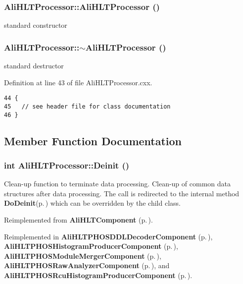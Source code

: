 \subsubsection{\setlength{\rightskip}{0pt plus 5cm}Ali\-HLTProcessor::Ali\-HLTProcessor ()}\label{classAliHLTProcessor_a0}


standard constructor 
\subsubsection{\setlength{\rightskip}{0pt plus 5cm}Ali\-HLTProcessor::$\sim${\bf Ali\-HLTProcessor} ()\hspace{0.3cm}{\tt  [virtual]}}\label{classAliHLTProcessor_a1}


standard destructor 

Definition at line 43 of file Ali\-HLTProcessor.cxx.

\footnotesize\begin{verbatim}44 { 
45   // see header file for class documentation
46 }
\end{verbatim}\normalsize 




\subsection{Member Function Documentation}
\subsubsection{\setlength{\rightskip}{0pt plus 5cm}int Ali\-HLTProcessor::Deinit ()\hspace{0.3cm}{\tt  [virtual]}}\label{classAliHLTProcessor_a3}


Clean-up function to terminate data processing. Clean-up of common data structures after data processing. The call is redirected to the internal method {\bf Do\-Deinit}{\rm (p.\,\pageref{classAliHLTComponent_b6})} which can be overridden by the child class. 

Reimplemented from {\bf Ali\-HLTComponent} {\rm (p.\,\pageref{classAliHLTComponent_a5})}.

Reimplemented in {\bf Ali\-HLTPHOSDDLDecoder\-Component} {\rm (p.\,\pageref{classAliHLTPHOSDDLDecoderComponent_a5})}, {\bf Ali\-HLTPHOSHistogram\-Producer\-Component} {\rm (p.\,\pageref{classAliHLTPHOSHistogramProducerComponent_a5})}, {\bf Ali\-HLTPHOSModule\-Merger\-Component} {\rm (p.\,\pageref{classAliHLTPHOSModuleMergerComponent_a5})}, {\bf Ali\-HLTPHOSRaw\-Analyzer\-Component} {\rm (p.\,\pageref{classAliHLTPHOSRawAnalyzerComponent_a5})}, and {\bf Ali\-HLTPHOSRcu\-Histogram\-Producer\-Component} {\rm (p.\,\pageref{classAliHLTPHOSRcuHistogramProducerComponent_a3})}.

